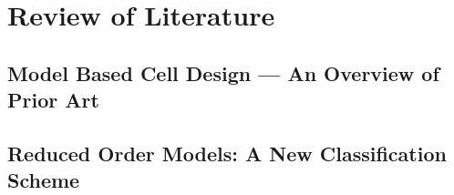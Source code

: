 

\clearpage
\chapter{Review of Literature}\label{ch:littreview}



\section{Model Based Cell Design --- An Overview of Prior Art}\label{sec:modelbasedliterature} 

\section{Reduced Order Models: A New Classification Scheme}\label{sec:classificationscheme}

